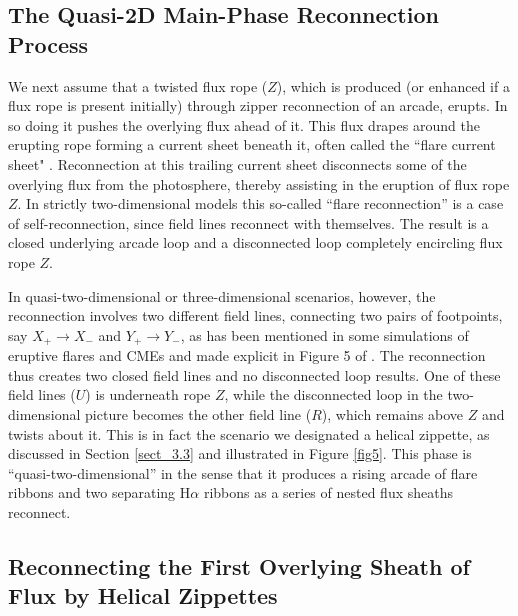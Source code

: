 \documentclass[10pt,namedreferneces]{SolarPhysics}
\begin{document}
\begin{article}
\section{The Quasi-2D Main-Phase Reconnection Process} 
\label{sect_5}

We next assume that a twisted flux rope ($Z$), which is produced (or enhanced if a flux rope is present initially) through zipper reconnection of an arcade, erupts.  In so doing it pushes the overlying flux ahead of it.  This flux drapes around the erupting rope forming a current sheet beneath it, often called the ``flare current sheet" \cite{priest00,karpen12,longcope14}.  Reconnection at this trailing current sheet disconnects some of the overlying flux from the photosphere, thereby assisting in the eruption of flux rope $Z$.  In strictly two-dimensional models this so-called ``flare reconnection'' is a case of self-reconnection, since field lines reconnect with themselves.  The result is a closed underlying arcade loop and a disconnected loop completely encircling flux rope $Z$.  

In quasi-two-dimensional or three-dimensional scenarios, however, the reconnection involves two different field lines, connecting two pairs of footpoints, say $X_+\to X_-$ and $Y_+\to Y_-$,
as has been mentioned in some simulations of eruptive flares and CMEs \cite{manchester04,fan07a} and made explicit in Figure 5 of .
  The reconnection thus creates two closed field lines and no disconnected loop results.  One of these field lines ($U$) is underneath rope $Z$, while the disconnected loop in the two-dimensional picture becomes the other field line ($R$), which remains above $Z$ and twists about it. This is in fact the scenario we designated a helical zippette, as discussed in Section \ref{sect_3.3} and illustrated in Figure \ref{fig5}. This phase is ``quasi-two-dimensional'' in the sense that it produces a rising arcade of flare ribbons and two separating H$\alpha$ ribbons as a series of nested flux sheaths reconnect.

\subsection{\bf Reconnecting the First Overlying Sheath of Flux by Helical Zippettes}
\label{sect_5.1}


\end{article}
\end{document}
